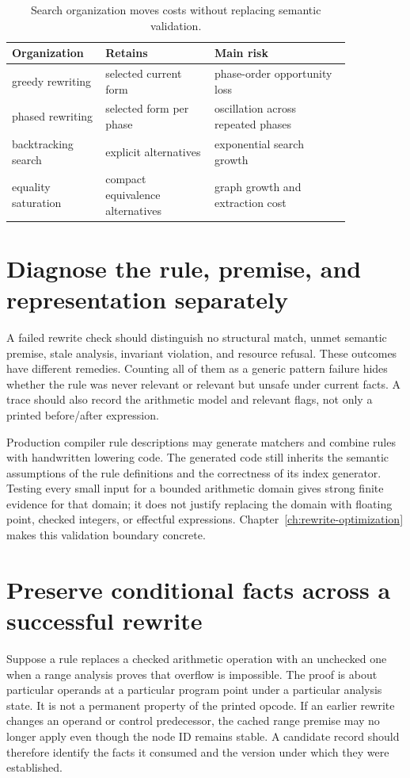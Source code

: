\begin{table}[htbp]
\caption{Search organization moves costs without replacing semantic validation.}
\label{tab:ch85-phases}
\centering
\begin{tabular}{p{0.21\linewidth}p{0.29\linewidth}p{0.35\linewidth}}
\toprule
Organization & Retains & Main risk \\
\midrule
greedy rewriting & selected current form & phase-order opportunity loss \\
phased rewriting & selected form per phase & oscillation across repeated phases \\
backtracking search & explicit alternatives & exponential search growth \\
equality saturation & compact equivalence alternatives & graph growth and extraction cost \\
\bottomrule
\end{tabular}
\end{table}

\section{Diagnose the rule, premise, and representation separately}
\label{sec:ch85-diagnostics}
A failed rewrite check should distinguish no structural match, unmet semantic premise, stale analysis, invariant violation, and resource refusal.
These outcomes have different remedies.
Counting all of them as a generic pattern failure hides whether the rule was never relevant or relevant but unsafe under current facts.
A trace should also record the arithmetic model and relevant flags, not only a printed before/after expression.

Production compiler rule descriptions may generate matchers and combine rules with handwritten lowering code.
The generated code still inherits the semantic assumptions of the rule definitions and the correctness of its index generator.
Testing every small input for a bounded arithmetic domain gives strong finite evidence for that domain; it does not justify replacing the domain with floating point, checked integers, or effectful expressions.
Chapter~\ref{ch:rewrite-optimization} makes this validation boundary concrete.

\section{Preserve conditional facts across a successful rewrite}
\label{sec:ch85-premises}
Suppose a rule replaces a checked arithmetic operation with an unchecked one when a range analysis proves that overflow is impossible.
The proof is about particular operands at a particular program point under a particular analysis state.
It is not a permanent property of the printed opcode.
If an earlier rewrite changes an operand or control predecessor, the cached range premise may no longer apply even though the node ID remains stable.
A candidate record should therefore identify the facts it consumed and the version under which they were established.

